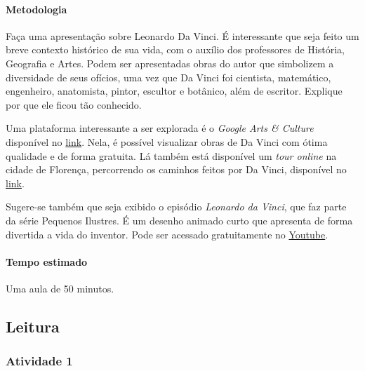 \documentclass[11pt]{extarticle}
\begin{document}

\paragraph{Metodologia} Faça uma apresentação sobre Leonardo Da Vinci. É interessante que seja feito um breve contexto histórico de sua vida, com o auxílio dos professores de História, Geografia e Artes. Podem ser apresentadas obras do autor que simbolizem a diversidade de seus ofícios, uma vez que Da Vinci foi cientista, matemático, engenheiro, anatomista, pintor, escultor e botânico, além de escritor. Explique por que ele ficou tão conhecido.

Uma plataforma interessante a ser explorada é o \textit{Google Arts \& Culture} disponível no \href{https://artsandculture.google.com/entity/\%2Fm\%2F04lg6?hl=pt-BR\&col=RGB_0E182D}{link}. Nela, é possível visualizar obras de Da Vinci com ótima qualidade e de forma gratuita. Lá também está disponível um \textit{tour online} na cidade de Florença, percorrendo os caminhos feitos por Da Vinci, disponível no \href{https://artsandculture.google.com/story/sQURHljckUgVZQ?hl=pt-BR}{link}.

Sugere-se também que seja exibido o episódio \textit{Leonardo da Vinci}, que faz parte da série Pequenos Ilustres. É um desenho animado curto que apresenta de forma divertida a vida do inventor. Pode ser acessado gratuitamente no \href{https://youtu.be/0hwJzpATtjg}{Youtube}.

\paragraph{Tempo estimado} Uma aula de 50 minutos.

\subsection{Leitura}

\subsubsection{Atividade 1}

\end{document}
